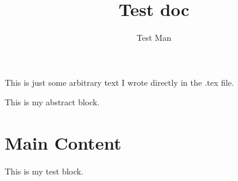\documentclass[a4paper,11pt,oneside]{book}
\title{\Huge \textbf{Test doc}}
\author{Test Man}
\begin{document}
\maketitle

This is just some arbitrary text I wrote directly in the .tex file.

This is my abstract block.



\section{Main Content}







This is my test block.
\end{document}
